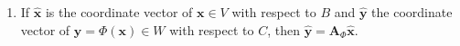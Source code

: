 \begin{enumerate}
\begin{enumerate}
        \item If $\hat{\bm{x}}$ is the coordinate vector of $\bm{x} \in V$ with respect to $B$ and $\hat{\bm{y}}$ the coordinate vector of $\bm{y} = \Phi(\bm{x}) \in W$ with respect to $C$, then $\hat{\bm{y}} = \bm{A}_\Phi \hat{\bm{x}}$.
        \hfill \cite{mfml/book/mml/Deisenroth-Faisal-Ong}
    \end{enumerate}    
\end{enumerate}



























